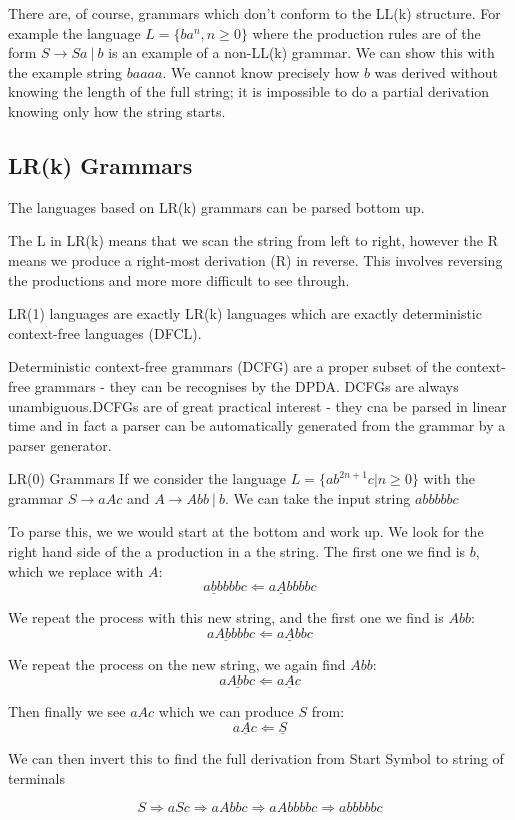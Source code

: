 There are, of course, grammars which don't conform to the LL(k) structure. For example the language $L=\{ba^n, n \geq 0\}$ where the production rules are of the form $S \rightarrow Sa\ |\ b$ is an example of a non-LL(k) grammar. We can show this with the example string $baaaa$. We cannot know precisely how $b$ was derived without knowing the length of the full string; it is impossible to do a partial derivation knowing only how the string starts. 

\subsection{LR(k) Grammars}
The languages based on LR(k) grammars can be parsed bottom up. 

The L in LR(k) means that we scan the string from left to right, however the R means we produce a right-most derivation (R) in reverse. This involves reversing the productions and more more difficult to see through.

LR(1) languages are exactly LR(k) languages which are exactly deterministic context-free languages (DFCL).

Deterministic context-free grammars (DCFG) are a proper subset of the context-free grammars - they can be recognises by the DPDA. DCFGs are always unambiguous.DCFGs are of great practical interest - they cna be parsed in linear time and in fact a parser can be automatically generated from the grammar by a parser generator. 

\begin{example}{LR(0) Grammars}
If we consider the language $L = \{ab^{2n+1}c | n \geq 0\}$ with the grammar $S \rightarrow aAc$ and $A \rightarrow Abb\ |\ b$. We can take the input string $abbbbbc$

To parse this, we we would start at the bottom and work up. We look for the right hand side of the a production in a the string. The first one we find is $b$, which we replace with $A$:
\[a\underline{b}bbbbc \Leftarrow a\underline{A}bbbbc\]

We repeat the process with this new string, and the first one we find is $Abb$:
\[a\underline{Abb}bbc \Leftarrow a\underline{A}bbc\]

We repeat the process on the new string, we again find $Abb$:
\[a\underline{Abb}c \Leftarrow a\underline{A}c\]

Then finally we see $aAc$ which we can produce $S$ from:
\[a\underline{A}c \Leftarrow \underline{S}\]

We can then invert this to find the full derivation from Start Symbol to string of terminals

\[S \Rightarrow aSc \Rightarrow aAbbc \Rightarrow aAbbbbc \Rightarrow abbbbbc\]
\end{example}
